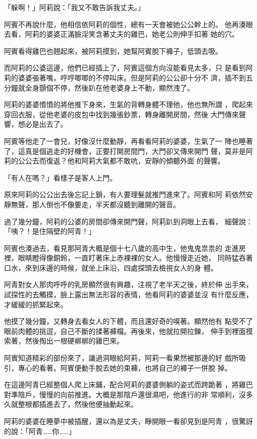 「躲啊！」阿莉說：「我又不敢告訴我丈夫。」

阿賓不再說什麼，他相信依阿莉的個性，總有一天會被她公公幹上的。
他再湊眼去看，阿莉的婆婆正滿臉淫笑含著丈夫的雞巴，她老公則伸手扣著
她的穴。

阿賓看得雞巴也翹起來，被阿莉摸到，她幫阿賓脫下褲子，低頭去吸。

而阿莉的公婆這邊，他們已經插上了，阿賓這個方向沒能看見太多，只
是看到阿莉的婆婆張著嘴，哼哼唧唧的不停叫床。但是阿莉的公公卻十分不
濟，插不到五分鐘就全身顫個不停，然後趴在他老婆身上不動，顯然洩了。

阿莉的婆婆憤憤的將他推下身來，生氣的背轉身體不理他，他也無所謂
，爬起來穿回衣服，從他老婆的皮包中找到幾張鈔票，轉身離開房間，然後
大門傳來聲響，想必是出去了。

阿賓等他走了一會兒，好像沒什麼動靜，再看看阿莉的婆婆，生氣了一
陣也睡著了，這真是個逃走的好機會，正要打開房間門，大門卻又傳來開門
聲，莫非是阿莉的公公去而復返？他和阿莉大氣都不敢吭，安靜的傾聽外面
的聲響。

「有人在嗎？」看樣子是客人上門。

原來阿莉的公公出去後忘記上鎖，有人要理髮就推門進來了。阿賓和阿
莉依然安靜無聲，那人倒也不像要走，半天都沒聽到離開的聲音。

過了幾分鐘，阿莉的公婆的房間卻傳來開門聲，阿莉趴到洞眼上去看，
細聲說：「咦？！是住隔壁的阿青！」

阿賓也湊過去，看見那阿青大概是個十七八歲的高中生，他鬼鬼祟祟的
走進房裡，眼睛瞪得像銅鈴，一直盯著床上赤裸裸的女人。他慢慢走近她，
同時猛吞著口水，來到床邊的時候，就坐上床沿，四處探頭去檢視女人的身
體。

阿青對女人那肉呼呼的乳房顯然很有興趣，注視了老半天之後，終於伸
出手來，試探性的去觸摸，臉上露出無法形容的表情，他看阿莉的婆婆並沒
有什麼反應，才緩緩的抓緊起來。

他摸了幾分鐘，又轉身去看女人的下體，而且還好奇的嗅著。顯然他有
點受不了眼前肉體的挑逗，自己不斷的揉著褲檔。再後來，他就拉開拉鍊，
伸手到裡面摸索著，然後掏出一根硬梆梆的雞巴來。

阿賓知道精彩的部份來了，讓過洞眼給阿莉，阿莉一看果然被那邊的好
戲所吸引，專心的看著。阿賓便動手脫去她的束褲，也將自己的褲子一併脫
掉。

在這邊阿青已經整個人爬上床鋪，配合阿莉的婆婆側躺的姿式而跨跪著
，將雞巴對準陰戶，慢慢的向前推進。大概是那陰戶還很濕吧，他進行的非
常順利，沒多久就整根都插進去了，然後他便抽動起來。

阿莉的婆婆在睡夢中被插醒，還以為是丈夫，睜開眼一看卻見到是阿青
，很驚訝的說：「阿青……你……」

